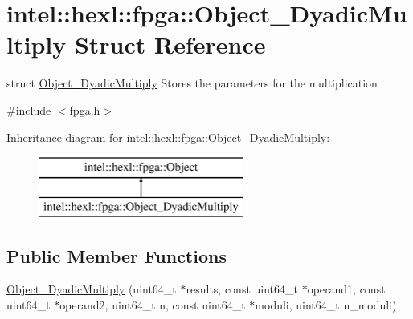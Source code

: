 \hypertarget{structintel_1_1hexl_1_1fpga_1_1Object__DyadicMultiply}{\section{intel\-:\-:hexl\-:\-:fpga\-:\-:Object\-\_\-\-Dyadic\-Multiply Struct Reference}
\label{structintel_1_1hexl_1_1fpga_1_1Object__DyadicMultiply}
}


struct \hyperlink{structintel_1_1hexl_1_1fpga_1_1Object__DyadicMultiply}{Object\-\_\-\-Dyadic\-Multiply} Stores the parameters for the multiplication  




{\ttfamily \#include $<$fpga.\-h$>$}

Inheritance diagram for intel\-:\-:hexl\-:\-:fpga\-:\-:Object\-\_\-\-Dyadic\-Multiply\-:\begin{figure}[H]
\begin{center}
\leavevmode
\includegraphics[height=2.000000cm]{structintel_1_1hexl_1_1fpga_1_1Object__DyadicMultiply}
\end{center}
\end{figure}
\subsection*{Public Member Functions}
\begin{DoxyCompactItemize}
\item 
\hyperlink{structintel_1_1hexl_1_1fpga_1_1Object__DyadicMultiply_ae5dfbf4542c84cf45cefbbca727d4409}{Object\-\_\-\-Dyadic\-Multiply} (uint64\-\_\-t $\ast$results, const uint64\-\_\-t $\ast$operand1, const uint64\-\_\-t $\ast$operand2, uint64\-\_\-t n, const uint64\-\_\-t $\ast$moduli, uint64\-\_\-t n\-\_\-moduli)
\end{DoxyCompactItemize}

